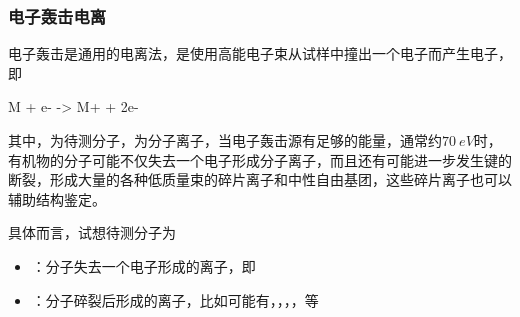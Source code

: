 \subsubsection{电子轰击电离}
电子轰击是通用的电离法，是使用高能电子束从试样中撞出一个电子而产生电子，即
\begin{Chemeq}
    M + e- -> M+ + 2e-
\end{Chemeq}
其中，为待测分子，为分子离子，当电子轰击源有足够的能量，通常约$\SI{70}{eV}$时，有机物的分子可能不仅失去一个电子形成分子离子，而且还有可能进一步发生键的断裂，形成大量的各种低质量束的碎片离子和中性自由基团，这些碎片离子也可以辅助结构鉴定。

具体而言，试想待测分子为
\begin{itemize}
    \item {}：分子失去一个电子形成的离子，即
    \item {}：分子碎裂后形成的离子，比如可能有，，，，等
\end{itemize}
